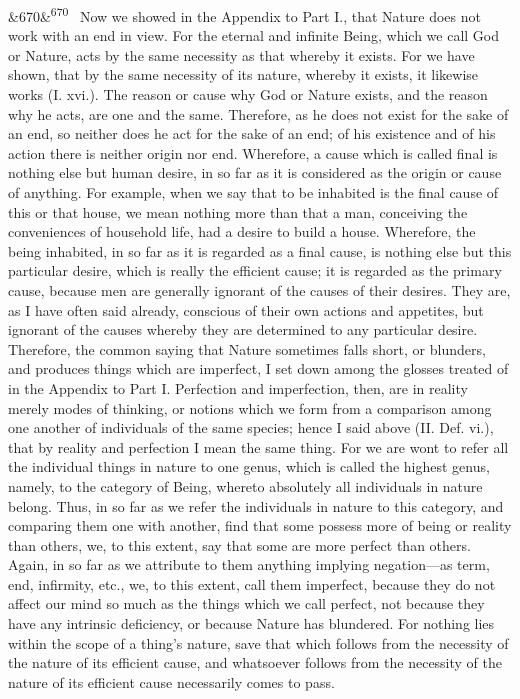 \documentclass[12pt]{article}
\newcommand{\para}[1][]{\par\noindent\ifx&#1&\else\textsuperscript{\footnotesize #1}~\fi}
\begin{document}
\para[670] Now we showed in the Appendix to Part I., that Nature does not work with an end in view. For the eternal and infinite Being, which we call God or Nature, acts by the same necessity as that whereby it exists. For we have shown, that by the same necessity of its nature, whereby it exists, it likewise works (I. xvi.). The reason or cause why God or Nature exists, and the reason why he acts, are one and the same. Therefore, as he does not exist for the sake of an end, so neither does he act for the sake of an end; of his existence and of his action there is neither origin nor end. Wherefore, a cause which is called final is nothing else but human desire, in so far as it is considered as the origin or cause of anything. For example, when we say that to be inhabited is the final cause of this or that house, we mean nothing more than that a man, conceiving the conveniences of household life, had a desire to build a house. Wherefore, the being inhabited, in so far as it is regarded as a final cause, is nothing else but this particular desire, which is really the efficient cause; it is regarded as the primary cause, because men are generally ignorant of the causes of their desires. They are, as I have often said already, conscious of their own actions and appetites, but ignorant of the causes whereby they are determined to any particular desire. Therefore, the common saying that Nature sometimes falls short, or blunders, and produces things which are imperfect, I set down among the glosses treated of in the Appendix to Part I. Perfection and imperfection, then, are in reality merely modes of thinking, or notions which we form from a comparison among one another of individuals of the same species; hence I said above (II. Def. vi.), that by reality and perfection I mean the same thing. For we are wont to refer all the individual things in nature to one genus, which is called the highest genus, namely, to the category of Being, whereto absolutely all individuals in nature belong. Thus, in so far as we refer the individuals in nature to this category, and comparing them one with another, find that some possess more of being or reality than others, we, to this extent, say that some are more perfect than others. Again, in so far as we attribute to them anything implying negation---as term, end, infirmity, etc., we, to this extent, call them imperfect, because they do not affect our mind so much as the things which we call perfect, not because they have any intrinsic deficiency, or because Nature has blundered. For nothing lies within the scope of a thing's nature, save that which follows from the necessity of the nature of its efficient cause, and whatsoever follows from the necessity of the nature of its efficient cause necessarily comes to pass.
\end{document}
